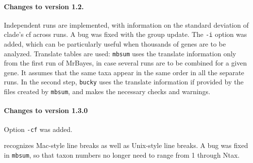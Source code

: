 \documentclass[12pt,english,final,letterpaper]{article}
\begin{document}
\paragraph{Changes to version 1.2.}
Independent runs are implemented, with information on the standard deviation
of clade's {\sc cf} across runs. A bug was fixed with the group update.
The {\tt -i} option was added, which can be particularly useful when
thousands of genes are to be analyzed. Translate tables are used: {\tt mbsum}
uses the translate information only from the first run of MrBayes,
in case several runs are to be combined for a given gene. It assumes
that the same taxa appear in the same order in all the separate runs.
In the second step, {\tt bucky} uses the translate information if provided 
by the files created by {\tt mbsum}, and makes the necessary checks and
warnings.

\paragraph{Changes to version 1.3.0}
Option {\tt -cf} was added.

 recognizes Mac-style line breaks as well as
Unix-style line breaks. A bug was fixed in {\tt mbsum}, 
so that taxon numbers no longer need to range from 1 through Ntax.
\end{document}

